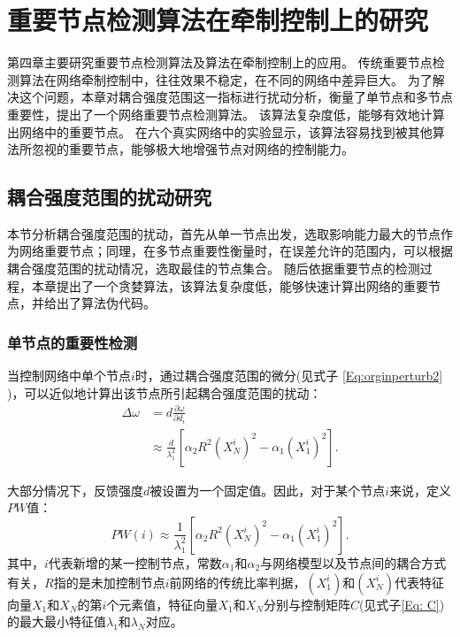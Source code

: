 \section{重要节点检测算法在牵制控制上的研究}

第四章主要研究重要节点检测算法及算法在牵制控制上的应用。
传统重要节点检测算法在网络牵制控制中，往往效果不稳定，在不同的网络中差异巨大。
为了解决这个问题，本章对耦合强度范围这一指标进行扰动分析，衡量了单节点和多节点重要性，提出了一个网络重要节点检测算法。
该算法复杂度低，能够有效地计算出网络中的重要节点。
在六个真实网络中的实验显示，该算法容易找到被其他算法所忽视的重要节点，能够极大地增强节点对网络的控制能力。

\subsection{耦合强度范围的扰动研究}

本节分析耦合强度范围的扰动，首先从单一节点出发，选取影响能力最大的节点作为网络重要节点；同理，在多节点重要性衡量时，在误差允许的范围内，可以根据耦合强度范围的扰动情况，选取最佳的节点集合。
随后依据重要节点的检测过程，本章提出了一个贪婪算法，该算法复杂度低，能够快速计算出网络的重要节点，并给出了算法伪代码。

\subsubsection{单节点的重要性检测}

当控制网络中单个节点$ i $时，通过耦合强度范围的微分(见式子 \ref{Eq:orginperturb2} )，可以近似地计算出该节点所引起耦合强度范围的扰动：
\begin{equation}
\begin{aligned}
\Delta \omega  &= d\frac{\partial \omega}{\partial d_i}
\\
&\approx \frac{d}{\lambda_1^2}[\alpha_2R^2(X_N^i)^2-\alpha_1(X_1^i)^2]. 
\end{aligned}
\label{Eq: Delta_omega}
\end{equation}

大部分情况下，反馈强度$ d $被设置为一个固定值。因此，对于某个节点$ i $来说，定义$ PW $值：
\begin{equation}
PW(i) \approx \frac{1}{\lambda_1^2}[\alpha_2R^2(X_N^i)^2-\alpha_1(X_1^i)^2].
\label{Eq: PWi}
\end{equation}
其中，$ i $代表新增的某一控制节点，常数$ \alpha_1 $和$ \alpha_2 $与网络模型以及节点间的耦合方式有关，$ R $指的是未加控制节点$ i $前网络的传统比率判据，$ (X_1^i) $和$ (X_N^i) $代表特征向量$ X_1 $和$ X_N $的第$ i $个元素值，特征向量$ X_1 $和$ X_N $分别与控制矩阵$ C $(见式子\ref{Eq: C})的最大最小特征值$ \lambda_1 $和$ \lambda_N $对应。

